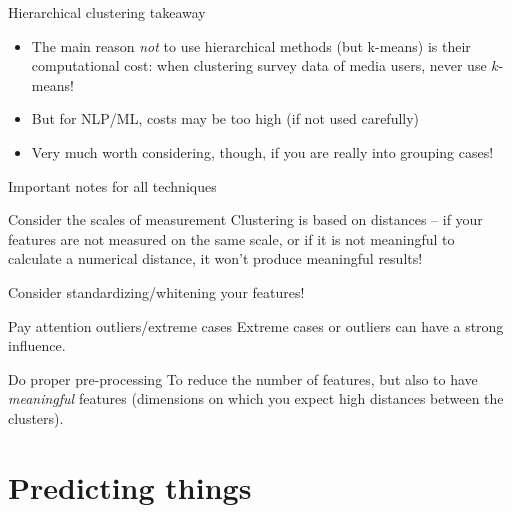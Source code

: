 \documentclass[compress]{beamer}
\begin{document}
\begin{frame}{Hierarchical clustering takeaway}
\begin{itemize}
\item The main reason \emph{not} to use hierarchical methods (but k-means) is their computational cost: when clustering survey data of media users, never use $k$-means!
\item But for NLP/ML, costs may be too high (if not used carefully)
\item Very much worth considering, though, if you are really into grouping cases!
\end{itemize}
\end{frame}





\begin{frame}{Important notes for all techniques}
\begin{block}{Consider the scales of measurement}
Clustering is based on distances -- if your features are not measured on the same scale, or if it is not meaningful to calculate a numerical distance, it won't produce meaningful results!

Consider standardizing/whitening your features!
\end{block}

\pause

\begin{block}{Pay attention outliers/extreme cases}
Extreme cases or outliers can have a strong influence.
\end{block}

\pause 
\begin{block}{Do proper pre-processing}
To reduce the number of features, but also to have \emph{meaningful} features (dimensions on which you expect high distances between the clusters).
\end{block}


\end{frame}


\section{Predicting things}
\end{document}
